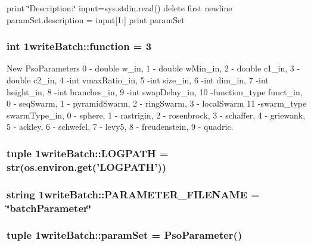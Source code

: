 print \char`\"{}Description:\char`\"{} input=sys.stdin.read() delete first newline paramSet.description = input\mbox{[}1:\mbox{]} print paramSet 

\hypertarget{namespace1writeBatch_a7ecce065fb47d41cb2018e9a1295783}{
\subsubsection{\setlength{\rightskip}{0pt plus 5cm}int 1writeBatch::function = 3}}
\label{namespace1writeBatch_a7ecce065fb47d41cb2018e9a1295783}


New PsoParameters 0 - double w\_\-in, 1 - double wMin\_\-in, 2 - double c1\_\-in, 3 - double c2\_\-in, 4 -int vmaxRatio\_\-in, 5 -int size\_\-in, 6 -int dim\_\-in, 7 -int height\_\-in, 8 -int branches\_\-in, 9 -int swapDelay\_\-in, 10 -function\_\-type funct\_\-in, 0 - seqSwarm, 1 - pyramidSwarm, 2 - ringSwarm, 3 - localSwarm 11 -swarm\_\-type swarmType\_\-in, 0 - sphere, 1 - rastrigin, 2 - rosenbrock, 3 - schaffer, 4 - griewank, 5 - ackley, 6 - schwefel, 7 - levy5, 8 - freudenstein, 9 - quadric. 

\hypertarget{namespace1writeBatch_881ecbadb139f162fdc515a7e137af1c}{
\subsubsection{\setlength{\rightskip}{0pt plus 5cm}tuple 1writeBatch::LOGPATH = str(os.environ.get('{\bf LOGPATH}'))}}
\label{namespace1writeBatch_881ecbadb139f162fdc515a7e137af1c}


\hypertarget{namespace1writeBatch_f67acb0a0795d91f6b2129a95004f4c7}{
\subsubsection{\setlength{\rightskip}{0pt plus 5cm}string 1writeBatch::PARAMETER\_\-FILENAME = \char`\"{}batchParameter\char`\"{}}}
\label{namespace1writeBatch_f67acb0a0795d91f6b2129a95004f4c7}


\hypertarget{namespace1writeBatch_ccdaad4397f12c1fe9e5a9d2e090ee2d}{
\subsubsection{\setlength{\rightskip}{0pt plus 5cm}tuple 1writeBatch::paramSet = {\bf PsoParameter}()}}
\label{namespace1writeBatch_ccdaad4397f12c1fe9e5a9d2e090ee2d}


